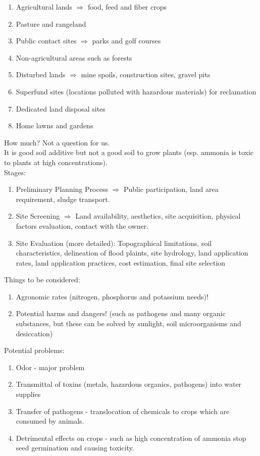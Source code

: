 \documentclass{article}
\numberwithin{equation}{section}
\begin{document}
\begin{enumerate}
    \item Agricultural lands $\Rightarrow$ food, feed and fiber crops
    \item Pasture and rangeland
    \item Public contact sites $\Rightarrow$ parks and golf courses
    \item Non-agricultural areas such as forests
    \item Disturbed lands $\Rightarrow$ mine spoils, construction sites, gravel pits
    \item Superfund sites (locations polluted with hazardous materials) for reclamation
    \item Dedicated land disposal sites
    \item Home lawns and gardens
\end{enumerate}
How much? Not a question for us.\\
It is good soil additive but not a good soil to grow plants (esp. ammonia is toxic to plants at high concentrations).\\
Stages:
\begin{enumerate}
    \item Preliminary Planning Process $\Rightarrow$ Public participation, land area requirement, sludge transport.
    \item Site Screening $\Rightarrow$ Land availability, aesthetics, site acquisition, physical factors evaluation, contact with the owner.
    \item Site Evaluation (more detailed): Topographical limitations, soil characteristics, delineation of flood plaints, site hydrology, land application rates, land application practices, cost estimation, final site selection
\end{enumerate}
Things to be considered:
\begin{enumerate}
    \item Agronomic rates (nitrogen, phosphorus and potassium needs)!
    \item Potential harms and dangers! (such as pathogens and many organic substances, but these can be solved by sunlight, soil microorganisms and desiccation)
\end{enumerate}
Potential problems:
\begin{enumerate}
    \item Odor - major problem
    \item Transmittal of toxins (metals, hazardous organics, pathogens) into water supplies
    \item Transfer of pathogens - translocation of chemicals to crops which are consumed by animals.
    \item Detrimental effects on crops - such as high concentration of ammonia stop seed germination and causing toxicity.
\end{enumerate}
\end{document}
